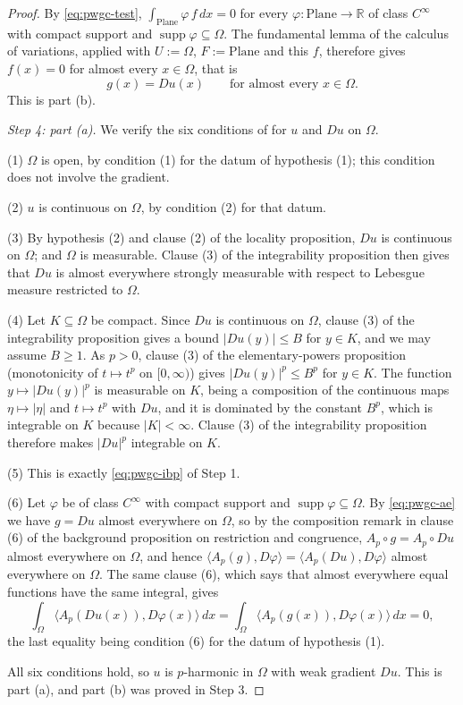 \begin{proof}
By \eqref{eq:pwgc-test}, $\int_{\mathrm{Plane}}\varphi\,f\,dx=0$ for every
$\varphi\colon\mathrm{Plane}\to\mathbb{R}$ of class $C^\infty$ with compact support and
$\operatorname{supp}\varphi\subseteq\Omega$.  The fundamental lemma of the calculus of
variations, applied with $U:=\Omega$, $F:=\mathrm{Plane}$ and this $f$, therefore gives
$f(x)=0$ for almost every $x\in\Omega$, that is
\begin{equation}\label{eq:pwgc-ae}
  g(x)=Du(x)\qquad\text{for almost every }x\in\Omega .
\end{equation}
This is part (b).

\medskip\noindent\emph{Step 4: part (a).}
We verify the six conditions of  for $u$ and $Du$ on $\Omega$.

(1) $\Omega$ is open, by condition (1) for the datum of hypothesis (1); this condition does not
involve the gradient.

(2) $u$ is continuous on $\Omega$, by condition (2) for that datum.

(3) By hypothesis (2) and clause (2) of the locality proposition, $Du$ is continuous on
$\Omega$; and $\Omega$ is measurable.  Clause (3) of the integrability proposition then gives
that $Du$ is almost everywhere strongly measurable with respect to Lebesgue measure restricted
to $\Omega$.

(4) Let $K\subseteq\Omega$ be compact.  Since $Du$ is continuous on $\Omega$, clause (3) of the
integrability proposition gives a bound $\lvert Du(y)\rvert\le B$ for $y\in K$, and we may
assume $B\ge1$.  As $p>0$, clause (3) of the elementary-powers proposition (monotonicity of
$t\mapsto t^{p}$ on $[0,\infty)$) gives $\lvert Du(y)\rvert^{p}\le B^{p}$ for $y\in K$.  The
function $y\mapsto\lvert Du(y)\rvert^{p}$ is measurable on $K$, being a composition of the
continuous maps $\eta\mapsto\lvert\eta\rvert$ and $t\mapsto t^{p}$ with $Du$, and it is
dominated by the constant $B^{p}$, which is integrable on $K$ because
$\lvert K\rvert<\infty$.  Clause (3) of the integrability proposition therefore makes
$\lvert Du\rvert^{p}$ integrable on $K$.

(5) This is exactly \eqref{eq:pwgc-ibp} of Step 1.

(6) Let $\varphi$ be of class $C^\infty$ with compact support and
$\operatorname{supp}\varphi\subseteq\Omega$.  By \eqref{eq:pwgc-ae} we have $g=Du$ almost
everywhere on $\Omega$, so by the composition remark in clause (6) of the background
proposition on restriction and congruence, $A_p\circ g=A_p\circ Du$ almost everywhere on
$\Omega$, and hence
$\bigl\langle A_p(g),D\varphi\bigr\rangle=\bigl\langle A_p(Du),D\varphi\bigr\rangle$ almost
everywhere on $\Omega$.  The same clause (6), which says that almost everywhere equal functions
have the same integral, gives
\[
  \int_\Omega\bigl\langle A_p(Du(x)),D\varphi(x)\bigr\rangle\,dx
  =\int_\Omega\bigl\langle A_p(g(x)),D\varphi(x)\bigr\rangle\,dx=0 ,
\]
the last equality being condition (6) for the datum of hypothesis (1).

\medskip\noindent All six conditions hold, so $u$ is $p$-harmonic in $\Omega$ with weak gradient
$Du$.  This is part (a), and part (b) was proved in Step 3.
\end{proof}
